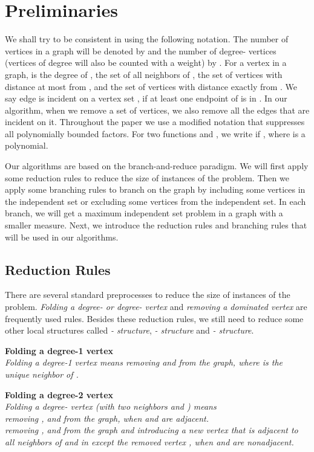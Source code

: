 \documentclass[runningheads]{llncs}
\begin{document}
\section{Preliminaries}
We shall try to be consistent in using the following notation. The
number of vertices in a graph will be denoted by  and the
number of degree- vertices (vertices of degree  will
also be counted with a weight) by . For a vertex  in a
graph,  is the degree of ,  the set of all
neighbors of ,  the set of vertices with
distance at most  from , and  the set of vertices
with distance exactly  from . We say edge  is incident on
a vertex set , if at least one endpoint of  is in . In
our algorithm, when we remove a set of vertices, we also remove
all the edges that are incident on it. Throughout the paper we use
a modified  notation that suppresses all polynomially bounded
factors. For two functions  and , we write  if , where  is a
polynomial.


Our algorithms are based on the branch-and-reduce paradigm. We
will first apply some reduction rules to reduce the size of
instances of the problem. Then we apply some branching rules to
branch on the graph by including some vertices in the independent
set or excluding some vertices from the independent set. In each
branch, we will get a maximum independent set problem in a graph
with a smaller measure. Next, we introduce the reduction rules and
branching rules that will be used in our algorithms.

\subsection{Reduction Rules}
There are several standard preprocesses to reduce the size of
instances of the problem. \emph{Folding a degree- or degree-
vertex} and \emph{removing a dominated vertex} are frequently used
rules. Besides these reduction rules, we still need to reduce some
other local structures called \emph{- structure},
\emph{- structure} and \emph{- structure}.

\vspace{2mm}\noindent \textbf{Folding a degree-1 vertex}\\
\emph{Folding a degree-1 vertex  means removing  and 
from the graph, where  is the unique neighbor of .}

\vspace{2mm}\noindent \textbf{Folding a degree-2 vertex}\\
\emph{Folding a degree- vertex  (with two neighbors  and
) means\\
 removing ,  and  from the
graph, when  and  are adjacent.\\
 removing ,  and  from the graph and introducing a
new vertex  that is adjacent to all neighbors of  and  in
 except the removed vertex , when  and  are
nonadjacent.}
\end{document}
